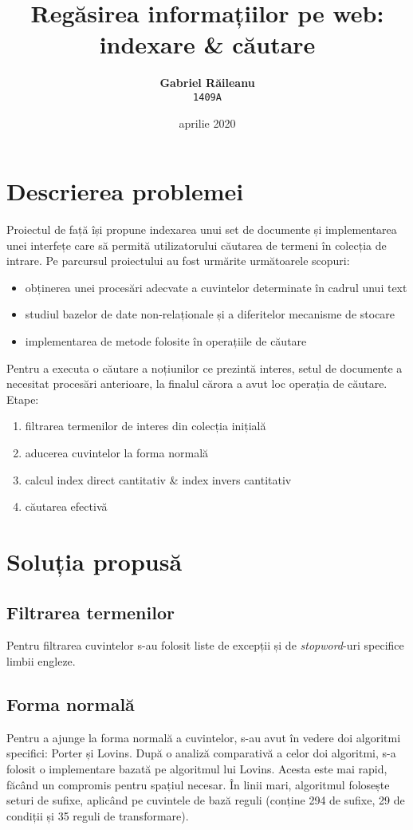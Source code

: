 \documentclass[12pt]{article}
\title{Regăsirea informațiilor pe web: indexare \& căutare} %
\author{\textbf{Gabriel Răileanu}\\ \texttt{1409A}} %
\date{aprilie 2020} %
\begin{document}
\maketitle %


\section{Descrierea problemei}
Proiectul de față își propune indexarea unui set de documente și implementarea unei interfețe care să permită utilizatorului căutarea de termeni în colecția de intrare.
Pe parcursul proiectului au fost urmărite următoarele scopuri:
\begin{itemize}
	\item obținerea unei procesări adecvate a cuvintelor determinate în cadrul unui text
	\item studiul bazelor de date non-relaționale și a diferitelor mecanisme de stocare
	\item implementarea de metode  folosite în operațiile de căutare
\end{itemize}
Pentru a executa o căutare a noțiunilor ce prezintă interes, setul de documente a necesitat procesări anterioare, la finalul cărora a avut loc operația de căutare. Etape:
\begin{enumerate}
	\item filtrarea termenilor de interes din colecția inițială
	\item aducerea cuvintelor la forma normală
	\item calcul index direct cantitativ \& index invers cantitativ
	\item căutarea efectivă
\end{enumerate}
\section{Soluția propusă}
\subsection{Filtrarea termenilor}
Pentru filtrarea cuvintelor s-au folosit liste de excepții și de \textit{stopword}-uri specifice limbii engleze.
\subsection{Forma normală}
Pentru a ajunge la forma normală a cuvintelor, s-au avut în vedere doi algoritmi specifici: Porter și Lovins. După o analiză comparativă a celor doi algoritmi, s-a folosit o implementare bazată pe algoritmul lui Lovins. Acesta este mai rapid, făcând un compromis pentru spațiul necesar. În linii mari, algoritmul folosește seturi de sufixe, aplicând pe cuvintele de bază reguli (conține 294 de sufixe, 29 de condiții și 35 reguli de transformare).
\end{document}
